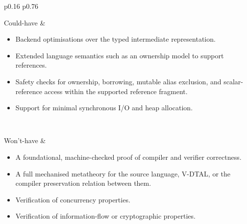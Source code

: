 \begin{table}[H]
\begin{tabular}{p{0.16\textwidth} p{0.76\textwidth}}
    \tablehline

    Could-have        &
    \begin{minipage}[t]{\linewidth}
      \begin{itemize}[leftmargin=*, nosep]
        \item Backend optimisations over the typed intermediate representation.
        \item Extended language semantics such as an ownership model to support references.
        \item Safety checks for ownership, borrowing, mutable alias exclusion, and scalar-reference access within the supported reference fragment.
        \item Support for minimal synchronous I/O and heap allocation.
      \end{itemize}
    \end{minipage}
    \\

    \tablehline

    Won't-have        &
    \begin{minipage}[t]{\linewidth}
      \begin{itemize}[leftmargin=*, nosep]
        \item A foundational, machine-checked proof of compiler and verifier correctness.
        \item A full mechanised metatheory for the source language, V-DTAL, or the compiler preservation relation between them.
        \item Verification of concurrency properties.
        \item Verification of information-flow or cryptographic properties.
      \end{itemize}
    \end{minipage}
    \\

    \tablehline
  \end{tabular}

  \caption{MoSCoW requirements used to keep the project focused on type-preserving compilation and independent low-level verification.}
  \label{tab:moscow-requirements}
\end{table}

